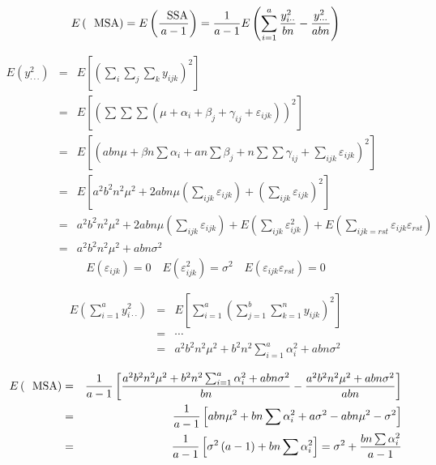 \documentclass{article}
\begin{document}
\bigskip

\begin{equation*}
E\left( \text{MSA}\right) =E\left( \frac{\text{SSA}}{a-1}\right) =\frac{1}{%
a-1}E\left( \sum\limits_{i=1}^{a}\frac{y_{i\cdot \cdot }^{2}}{bn}-\frac{%
y_{\cdot \cdot \cdot }^{2}}{abn}\right)
\end{equation*}

\begin{eqnarray*}
E\left( y_{\cdot \cdot \cdot }^{2}\right) &=&E\left[ \left(
\sum\limits_{i}\sum\limits_{j}\sum\limits_{k}y_{ijk}\right) ^{2}\right] \\
&=&E\left[ \left( \sum \sum \sum \left( \mu +\alpha _{i}+\beta _{j}+\gamma
_{ij}+\varepsilon _{ijk}\right) \right) ^{2}\right] \\
&=&E\left[ \left( abn\mu +\beta n\sum \alpha _{i}+an\sum \beta _{j}+n\sum
\sum \gamma _{ij}+\sum\limits_{ijk}\varepsilon _{ijk}\right) ^{2}\right] \\
&=&E\left[ a^{2}b^{2}n^{2}\mu ^{2}+2abn\mu \left(
\sum\limits_{ijk}\varepsilon _{ijk}\right) +\left(
\sum\limits_{ijk}\varepsilon _{ijk}\right) ^{2}\right] \\
&=&a^{2}b^{2}n^{2}\mu ^{2}+2abn\mu \left( \sum\limits_{ijk}\varepsilon
_{ijk}\right) +E\left( \sum\limits_{ijk}\varepsilon _{ijk}^{2}\right)
+E\left( \sum\limits_{ijk=rst}\varepsilon _{ijk}\varepsilon _{rst}\right) \\
&=&a^{2}b^{2}n^{2}\mu ^{2}+abn\sigma ^{2}
\end{eqnarray*}%
\begin{equation*}
E\left( \varepsilon _{ijk}\right) =0\quad E\left( \varepsilon
_{ijk}^{2}\right) =\sigma ^{2}\quad E\left( \varepsilon _{ijk}\varepsilon
_{rst}\right) =0
\end{equation*}

\bigskip

\begin{eqnarray*}
E\left( \sum\limits_{i=1}^{a}y_{i\cdot \cdot }^{2}\right) &=&E\left[
\sum\limits_{i=1}^{a}\left(
\sum\limits_{j=1}^{b}\sum\limits_{k=1}^{n}y_{ijk}\right) ^{2}\right] \\
&=&\cdots \\
&=&a^{2}b^{2}n^{2}\mu ^{2}+b^{2}n^{2}\sum_{i=1}^{a}\alpha _{i}^{2}+abn\sigma
^{2}
\end{eqnarray*}

\begin{eqnarray*}
E\left( \text{MSA}\right) &=&\frac{1}{a-1}\left[ \frac{a^{2}b^{2}n^{2}\mu
^{2}+b^{2}n^{2}\sum_{i=1}^{a}\alpha _{i}^{2}+abn\sigma ^{2}}{bn}-\frac{%
a^{2}b^{2}n^{2}\mu ^{2}+abn\sigma ^{2}}{abn}\right] \\
&=&\frac{1}{a-1}\left[ abn\mu ^{2}+bn\sum \alpha _{i}^{2}+a\sigma
^{2}-abn\mu ^{2}-\sigma ^{2}\right] \\
&=&\frac{1}{a-1}\left[ \sigma ^{2}\left( a-1\right) +bn\sum \alpha _{i}^{2}%
\right] =\sigma ^{2}+\frac{bn\sum \alpha _{i}^{2}}{a-1}
\end{eqnarray*}
\end{document}
